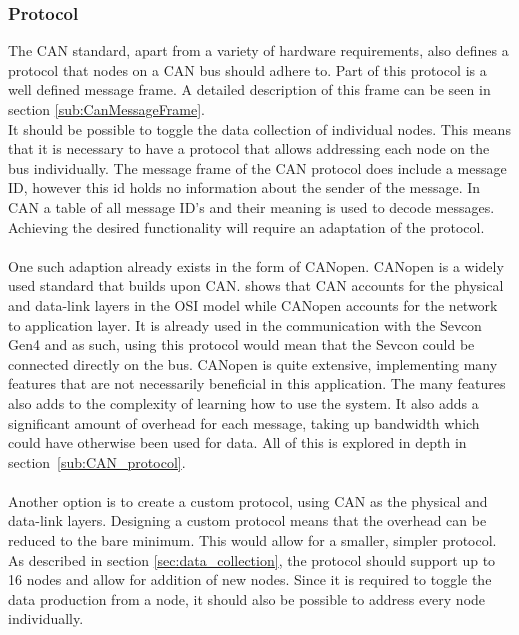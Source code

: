 \subsubsection*{Protocol}
The CAN standard, apart from a variety of hardware requirements, also defines a protocol that nodes on a CAN bus should adhere to.
Part of this protocol is a well defined message frame.
A detailed description of this frame can be seen in section \ref{sub:CanMessageFrame}.\\

It should be possible to toggle the data collection of individual nodes.
This means that it is necessary to have a protocol that allows addressing each node on the bus individually.
The message frame of the CAN protocol does include a message ID, however this id holds no information about the sender of the message.
In CAN a table of all message ID's and their meaning is used to decode messages.
Achieving the desired functionality will require an adaptation of the protocol. 
\\~\\
One such adaption already exists in the form of CANopen.
CANopen is a widely used standard that builds upon CAN.
\cite{CANopen_introduction} shows that CAN accounts for the physical and data-link layers in the OSI model while CANopen accounts for the network to application layer.
It is already used in the communication with the Sevcon Gen4 and as such, using this protocol would mean that the Sevcon could be connected directly on the bus.
CANopen is quite extensive, implementing many features that are not necessarily beneficial in this application.
The many features also adds to the complexity of learning how to use the system.
It also adds a significant amount of overhead for each message, taking up bandwidth which could have otherwise been used for data. 
All of this is explored in depth in section~\ref{sub:CAN_protocol}.
\\~\\
Another option is to create a custom protocol, using CAN as the physical and data-link layers.
Designing a custom protocol means that the overhead can be reduced to the bare minimum.
This would allow for a smaller, simpler protocol.
As described in section \ref{sec:data_collection}, the protocol should support up to 16 nodes and allow for addition of new nodes.
Since it is required to toggle the data production from a node, it should also be possible to address every node individually.
